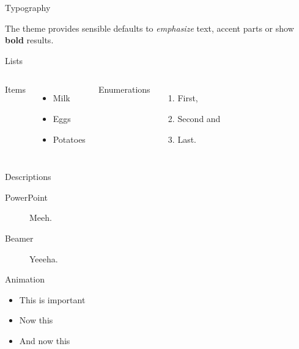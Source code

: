 \documentclass[aspectratio=169]{beamer}
\begin{document}
\begin{frame}{Typography}

The theme provides sensible defaults to \emph{emphasize}
text, \alert{accent} parts or show \textbf{bold} results.
\end{frame}

\begin{frame}{Lists}
  \begin{columns}[onlytextwidth]
      Items
      \begin{itemize}
        \item Milk \item Eggs \item Potatoes
      \end{itemize}

      Enumerations
      \begin{enumerate}
        \item First, \item Second and \item Last.
      \end{enumerate}
  \end{columns}
\end{frame}
\begin{frame}{Descriptions}
  \begin{description}
    \item[PowerPoint] Meeh.
    \item[Beamer] Yeeeha.
  \end{description}
\end{frame}
\begin{frame}{Animation}
  \begin{itemize}[<+- | alert@+>]
    \item \alert<4>{This is important}
    \item Now this
    \item And now this
  \end{itemize}
\end{frame}
\end{document}
